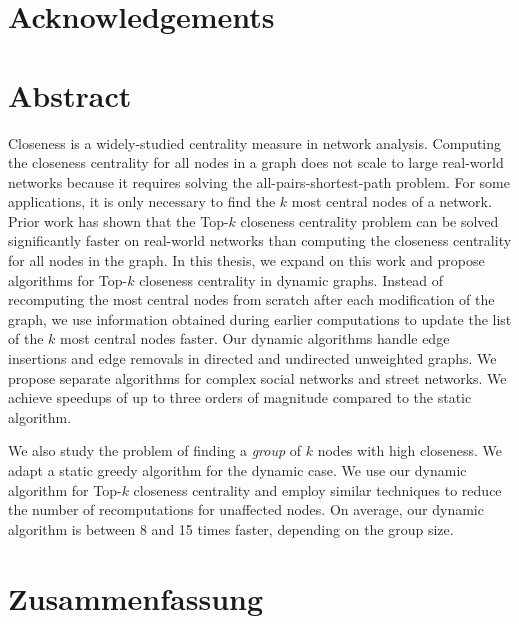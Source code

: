 \chapter{Acknowledgements}


\chapter{Abstract}

Closeness is a widely-studied centrality measure in network analysis. Computing the closeness centrality for all nodes in a graph does not scale to large real-world networks because it requires solving the all-pairs-shortest-path problem. For some applications, it is only necessary to find the $k$ most central nodes of a network. Prior work has shown that the Top-$k$ closeness centrality problem can be solved significantly faster on real-world networks than computing the closeness centrality for all nodes in the graph. In this thesis, we expand on this work and propose algorithms for Top-$k$ closeness centrality in dynamic graphs. Instead of recomputing the most central nodes from scratch after each modification of the graph, we use information obtained during earlier computations to update the list of the $k$ most central nodes faster. Our dynamic algorithms handle edge insertions and edge removals in directed and undirected unweighted graphs. We propose separate algorithms for complex social networks and street networks. We achieve speedups of up to three orders of magnitude compared to the static algorithm.

We also study the problem of finding a \emph{group} of $k$ nodes with high closeness. We adapt a static greedy algorithm for the dynamic case. We use our dynamic algorithm for Top-$k$ closeness centrality and employ similar techniques to reduce the number of recomputations for unaffected nodes. On average, our dynamic algorithm is between 8 and 15 times faster, depending on the group size.


\vspace{3cm}

\begingroup
\renewcommand{\cleardoublepage}{}
\renewcommand{\clearpage}{}
\chapter{Zusammenfassung}\label{chap:abstract_german}

\endgroup